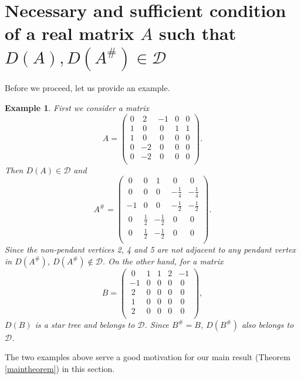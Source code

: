 \documentclass[notitlepage,12pt,reqno]{amsart}
\newtheorem{ex}[thm]{Example}
\numberwithin{equation}{section}
\begin{document}
\section{Necessary and sufficient condition of a real matrix $A$ such that $D(A),D(A^{\#})\in \mathcal{D}$}\label{section3}
Before we proceed, let us provide an example. 
\begin{ex}\label{twoexample}
First we consider a matrix
$$A=\begin{pmatrix}
0 & ~2 & -1 & 0 & 0\\
1 & ~0 & ~0 & 1 & 1\\
1 & ~0 & ~0 & 0 & 0\\
0 & -2 & ~0 & 0 & 0\\
0 & -2 & ~0 & 0 & 0\\
\end{pmatrix}.$$
Then $D(A)\in \mathcal{D}$ and
$$A^{\#}=\begin{pmatrix}
~0 & 0 & ~1 & ~0 & ~0\\
~0 & 0 & ~0 & -\frac{1}{4} & -\frac{1}{4}\\
-1 & 0 & ~0 & -\frac{1}{2} & -\frac{1}{2}\\
~0 & \frac{1}{2} & -\frac{1}{2} & ~0 & ~0\\
~0 & \frac{1}{2} & -\frac{1}{2} & ~0 & ~0\\
\end{pmatrix}.$$
Since the non-pendant vertices 2, 4 and 5 are not adjacent to any pendant vertex in $D(A^{\#})$, $D(A^{\#})\notin \mathcal{D}$. On the other hand, for a matrix $$B=\begin{pmatrix}
~0 & 1 & 1 & 2 & -1\\
-1 & 0 & 0 & 0 & ~0\\
~2 & 0 & 0 & 0 & ~0\\
~1 & 0 & 0 & 0 & ~0\\
~2 & 0 & 0 & 0 & ~0\\
\end{pmatrix},$$
$D(B)$ is a star tree and belongs to $\mathcal{D}$. Since $B^{\#}=B$, $D(B^{\#})$ also belongs to $\mathcal{D}$.
\end{ex}
The two examples above serve a good motivation for our main result (Theorem \ref{maintheorem}) in this section.
\end{document}
